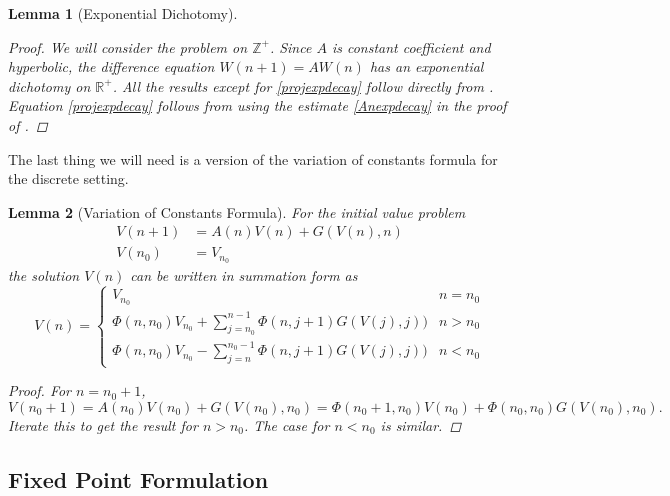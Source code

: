 \documentclass[12pt]{article}
\def\R{{\mathbb R}}
\def\Z{{\mathbb Z}}
\newtheorem{lemma}{Lemma}
\begin{document}
\begin{lemma}[Exponential Dichotomy]
\begin{proof}
We will consider the problem on $\Z^+$. Since $A$ is constant coefficient and hyperbolic, the difference equation $W(n+1) = A  W(n)$ has an exponential dichotomy on $\R^+$. All the results except for \eqref{projexpdecay} follow directly from \cite[Proposition 2.5]{Beyn1997}. Equation \eqref{projexpdecay} follows from using the estimate \eqref{Anexpdecay} in the proof of \cite[Proposition 2.5]{Beyn1997}.
\end{proof}
\end{lemma}

The last thing we will need is a version of the variation of constants formula for the discrete setting.

\begin{lemma}[Variation of Constants Formula]\label{VOC}
For the initial value problem
\begin{align*}
V(n+1) &= A(n) V(n) + G(V(n), n) \\
V(n_0) &= V_{n_0}
\end{align*}
the solution $V(n)$ can be written in summation form as 
\begin{equation}\label{VOCformula}
V(n) = 
\begin{cases}
V_{n_0} & n = n_0 \\
\Phi(n, n_0) V_{n_0} + \sum_{j = n_0}^{n-1} \Phi(n, j+1) G(V(j), j)) & n > n_0 \\
\Phi(n, n_0) V_{n_0} - \sum_{j = n}^{n_0-1} \Phi(n, j+1) G(V(j), j)) & n < n_0 
\end{cases}
\end{equation}
\begin{proof}
For $n = n_0 + 1$,
\[
V(n_0 + 1) = A(n_0) V(n_0) + G(V(n_0), n_0) = \Phi(n_0+1, n_0) V(n_0) + \Phi(n_0, n_0) G(V(n_0), n_0).
\]
Iterate this to get the result for $n > n_0$. The case for $n < n_0$ is similar.
\end{proof}
\end{lemma}

\subsection{Fixed Point Formulation}
\end{document}
